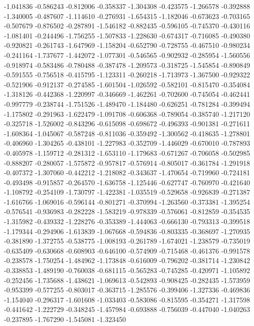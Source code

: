 -1.041836
-0.586243
-0.812006
-0.358337
-1.304308
-0.423575
-1.266578
-0.392888
-1.340005
-0.487607
-1.114610
-0.276931
-1.654315
-1.182046
-0.673623
-0.703165
-0.507679
-0.876502
-0.287891
-1.546182
-0.882435
-0.596105
-0.745370
-0.430116
-1.081401
-0.244496
-1.756255
-1.507833
-1.228630
-0.674317
-0.716085
-0.490380
-0.920821
-0.261743
-1.647969
-1.158204
-0.652790
-0.728755
-0.467510
-0.980234
-0.241164
-1.737677
-1.442072
-1.077301
-0.546565
-0.902932
-0.285954
-1.560556
-0.918974
-0.583486
-0.780488
-0.387478
-1.209573
-0.318725
-1.545854
-0.890849
-0.591555
-0.756518
-0.415795
-1.123311
-0.260218
-1.713973
-1.367500
-0.929322
-0.521906
-0.912137
-0.274585
-1.601504
-1.026592
-0.582101
-0.815470
-0.354084
-1.318126
-0.442368
-1.220997
-0.346669
-1.462261
-0.702600
-0.745054
-0.462441
-0.997779
-0.238744
-1.751526
-1.489470
-1.184480
-0.626251
-0.781284
-0.399494
-1.175802
-0.291963
-1.622479
-1.091708
-0.606368
-0.789054
-0.385740
-1.217120
-0.325718
-1.526002
-0.843296
-0.615098
-0.698672
-0.496393
-0.901381
-0.271611
-1.608364
-1.045067
-0.587248
-0.811036
-0.359492
-1.300562
-0.418635
-1.278801
-0.406960
-1.304265
-0.438101
-1.227983
-0.352709
-1.446029
-0.670010
-0.787893
-0.405978
-1.159712
-0.281312
-1.653110
-1.179683
-0.671267
-0.706058
-0.502985
-0.888207
-0.280057
-1.575872
-0.957817
-0.576914
-0.805017
-0.361784
-1.291918
-0.407372
-1.307060
-0.442212
-1.218082
-0.343637
-1.470654
-0.719960
-0.724181
-0.493498
-0.915857
-0.264570
-1.636758
-1.125446
-0.627747
-0.760970
-0.421640
-1.108792
-0.254109
-1.730797
-1.422381
-1.035519
-0.529658
-0.926839
-0.271387
-1.616766
-1.069016
-0.596144
-0.801271
-0.370994
-1.263560
-0.373381
-1.395254
-0.576541
-0.936983
-0.282228
-1.583219
-0.978339
-0.576061
-0.812859
-0.354535
-1.315982
-0.439332
-1.228276
-0.353389
-1.444063
-0.666130
-0.793313
-0.399518
-1.179344
-0.294906
-1.613839
-1.067668
-0.594836
-0.803335
-0.368697
-1.270935
-0.381890
-1.372755
-0.538775
-1.008193
-0.261789
-1.674021
-1.238579
-0.735019
-0.635409
-0.630668
-0.608903
-0.646100
-0.574909
-0.715468
-0.461376
-0.991578
-0.238578
-1.750254
-1.484962
-1.173848
-0.616009
-0.796202
-0.381714
-1.230842
-0.338853
-1.489190
-0.760038
-0.681115
-0.565283
-0.745285
-0.420971
-1.105892
-0.252456
-1.735688
-1.438621
-1.069613
-0.542893
-0.908425
-0.282435
-1.573959
-0.953399
-0.577255
-0.803017
-0.363715
-1.285576
-0.399406
-1.327336
-0.469836
-1.154040
-0.296317
-1.601608
-1.033403
-0.583086
-0.815595
-0.354271
-1.317598
-0.441642
-1.222729
-0.348245
-1.457984
-0.693888
-0.756039
-0.447040
-1.040263
-0.237895
-1.767290
-1.545081
-1.323450

